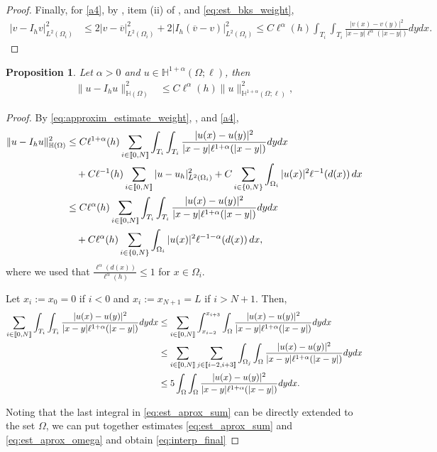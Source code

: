 \documentclass[11 pt]{article}
\newcommand\inter[1]{\llbracket #1\rrbracket}
\newtheorem{proposition}[theorem]{Proposition}
\numberwithin{equation}{section}
\newcommand{\weH}[1]{\mathbb H^{#1}(\Omega;\ell)}
\begin{document}
\begin{proof}
Finally, for \eqref{a4}, by , item (ii) of , and \eqref{eq:est_bks_weight}, 
\begin{align*}
    |v-I_h v|_{L^2(\Omega_i)}^2&\leq 2|v-\overline{v}|_{L^2(\Omega_i)}^2+2|I_h(\overline{v}-v)|_{L^2(\Omega_i)}^2\leq C\ell^{\alpha}(h)\int_{T_{i}}\int_{T_{i}}\frac{|v(x)-v(y)|^2}{|x-y|\ell^{\alpha}(|x-y|)}dy dx.
\end{align*}
\end{proof}


\begin{proposition}
Let $\alpha>0$ and $u\in\weH{1+\alpha}$, then
\begin{align}\label{eq:interp_final}
    \|u-I_hu\|^2_{\mathbb H(\Omega)}&\leq C\ell^{\alpha}(h) \|u\|^2_{\weH{1+\alpha}},
\end{align}
\end{proposition}
\begin{proof}
  By \eqref{eq:approxim_estimate_weight}, , and \eqref{a4},
%
\begin{align}
    \|u-I_h u\|^2_{\mathbb H(\Omega)}&\leq C \ell^{1+\alpha}(h)\sum_{i\in\inter{0,N}}\int_{T_i}\int_{T_i}\frac{|u(x)-u(y)|^2}{|x-y|\ell^{1+\alpha}(|x-y|)}dy dx\notag\\
    &\quad +C\ell^{-1}(h)\sum_{i\in\inter{0,N}}|u-u_h|_{L^2(\Omega_i)}^2+C\sum_{i\in\{0,N\}}\int_{\Omega_i}|u(x)|^2\ell^{-1}(d(x))\,dx\notag\\
    &\leq C \ell^{\alpha}(h)\sum_{i\in\inter{0,N}}\int_{T_i}\int_{T_i}\frac{|u(x)-u(y)|^2}{|x-y|\ell^{1+\alpha}(|x-y|)}dy dx\notag\\ 
    &\quad +C\ell^{\alpha}(h)\sum_{i\in\{0,N\}}\int_{\Omega_i}|u(x)|^2\ell^{-1-\alpha}(d(x))\,dx,\label{eq:est_aprox_sum}
\end{align}
where we used that $\frac{\ell^{\alpha}(d(x))}{\ell^{\alpha}(h)}\leq 1$ for $x\in\Omega_i$.  

Let $x_i:=x_0=0$ if $i<0$ and $x_i:=x_{N+1}=L$ if $i>N+1$.  Then, 
%
\begin{align}\notag
   \sum_{i\in\inter{0,N}} \int_{T_i}\int_{T_i}\frac{|u(x)-u(y)|^2}{|x-y|\ell^{1+\alpha}(|x-y|)}dy dx 
   &\leq \sum_{i\in\inter{0,N}} \int_{x_{i-2}}^{x_{i+3}}\int_{\Omega}\frac{|u(x)-u(y)|^2}{|x-y|\ell^{1+\alpha}(|x-y|)}dy dx\notag\\
   &\leq \sum_{i\in\inter{0,N}} \sum_{j\in \inter{i-2,i+3}}\int_{\Omega_j}\int_{\Omega}\frac{|u(x)-u(y)|^2}{|x-y|\ell^{1+\alpha}(|x-y|)}dy dx\notag\\
 & \leq 5\int_{\Omega}\int_{\Omega} \frac{|u(x)-u(y)|^2}{|x-y|\ell^{1+\alpha}(|x-y|)}dy dx. \label{eq:est_aprox_omega}
\end{align}

Noting that the last integral in \eqref{eq:est_aprox_sum} can be directly extended to the set $\Omega$, we can put together estimates \eqref{eq:est_aprox_sum} and \eqref{eq:est_aprox_omega} and obtain \eqref{eq:interp_final}
\end{proof}
%
\end{document}
